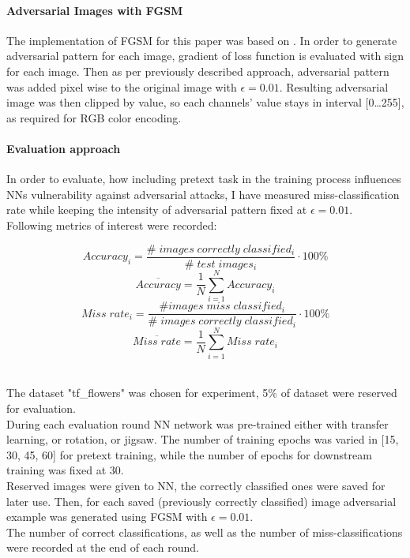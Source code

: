 \paragraph{Adversarial Images with FGSM}
The implementation of FGSM for this paper was based on \cite{FGSM}.
In order to generate adversarial pattern for each image,
gradient of loss function is evaluated with sign for each image.
Then as per previously described approach,
adversarial pattern was added pixel wise to the original image with $\epsilon = 0.01$.
Resulting adversarial image was then clipped by value, so each channels' value stays in interval [0\ldots255],
as required for RGB color encoding.

\paragraph{Evaluation approach}
In order to evaluate, how including pretext task in the training process influences NNs vulnerability against adversarial attacks,
I have measured miss-classification rate while keeping the intensity of adversarial pattern fixed at $\epsilon = 0.01$.
\\
Following metrics of interest were recorded:

\begin{equation}
    Accuracy_i = \frac{\# \; images \; correctly \; classified_i}{\# \; test \; images_i} \cdot 100 \%
\end{equation}
\begin{equation}
    \overline{Accuracy} = \frac{1}{N}  \sum_{i=1}^{N}{Accuracy_i}
\end{equation}
\begin{equation}
    Miss \; rate_i = \frac{\# images \; miss \; classified_i}{\# \; images \; correctly \; classified_i} \cdot 100 \%
\end{equation}
\begin{equation}
    \overline{Miss \; rate} = \frac{1}{N}  \sum_{i=1}^{N}{Miss \; rate_i}
\end{equation}


\\
The dataset "tf\_flowers" \cite{tfflowers} was chosen for experiment, 5\% of dataset were reserved for evaluation.
\\
During each evaluation round NN network was pre-trained either with transfer learning, or rotation, or jigsaw.
The number of training epochs was varied in [15, 30, 45,
60] for pretext training, while the number of epochs for downstream
training was fixed at 30.
\\
Reserved images were given to NN, the correctly classified ones were saved for later use.
Then, for each saved (previously correctly classified) image adversarial example was generated
using FGSM with $\epsilon = 0.01$.
\\
The number of correct classifications,
as well as the number of miss-classifications were recorded at the end of each round.
